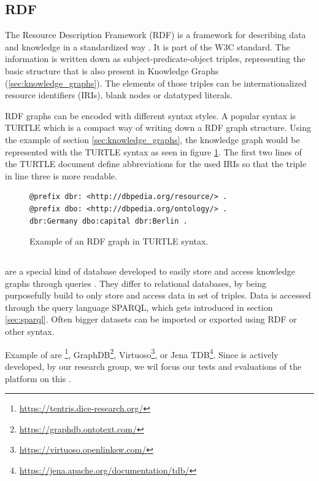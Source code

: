 \subsection{RDF}
\label{sec:rdf}
The Resource Description Framework (RDF) is a framework for describing data and knowledge in a standardized way \cite{RDFConceptsAbstract}. 
It is part of the W3C standard.
The information is written down as subject-predicate-object triples, representing the basic structure that is also present in Knowledge Graphs (\ref{sec:knowledge_graphs}).
The elements of those triples can be internationalized resource identifiers (IRIs), blank nodes or datatyped literals.

RDF graphs can be encoded with different syntax styles.
A popular syntax is TURTLE \cite{RDFTurtle} which is a compact way of writing down a RDF graph structure.
Using the example of section \ref{sec:knowledge_graphs}, the knowledge graph would be represented with the TURTLE syntax as seen in figure \ref{fig:rdf_turtle}.
The first two lines of the TURTLE document define abbreviations for the used IRIs so that the triple in line three is more readable.

\begin{figure}[tbph]
	\begin{lstlisting}
@prefix dbr: <http://dbpedia.org/resource/> .
@prefix dbo: <http://dbpedia.org/ontology/> .
dbr:Germany dbo:capital dbr:Berlin .
	\end{lstlisting}
	\caption{Example of an RDF graph in TURTLE syntax.}
	\label{fig:rdf_turtle}
\end{figure}


\subsection{\ts{}}
\label{sec:triplestores}
\tsp{} are a special kind of database developed to easily store and access knowledge graphs through queries \cite{rusherTriplestoresHttpsWww}.
They differ to relational databases, by being purposefully build to only store and access data in set of triples.
Data is accessed through the query language SPARQL, which gets introduced in section \ref{sec:sparql}.
Often bigger datasets can be imported or exported using RDF or other syntax.

Example of \tsp{} are \tentris{}\footnote{\url{https://tentris.dice-research.org/}}, GraphDB\footnote{\url{https://graphdb.ontotext.com/}}, Virtuoso\footnote{\url{https://virtuoso.openlinksw.com/}}, or Jena TDB\footnote{\url{https://jena.apache.org/documentation/tdb/}}.
Since \tentris{} is actively developed, by our research group, we wil focus our tests and evaluations of the platform on this \ts{}.

